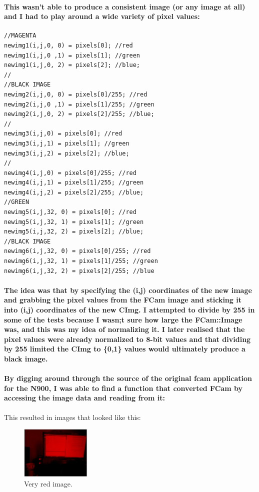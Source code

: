 \documentclass[11pt]{article} %
\begin{document}
\paragraph{This wasn't able to produce a consistent image (or any image at all) and I had to play around a wide variety of pixel values:}
\begin{frame}[fragile]
\begin{verbatim}
//MAGENTA
newimg1(i,j,0, 0) = pixels[0]; //red
newimg1(i,j,0 ,1) = pixels[1]; //green
newimg1(i,j,0, 2) = pixels[2]; //blue;
//
//BLACK IMAGE
newimg2(i,j,0, 0) = pixels[0]/255; //red
newimg2(i,j,0 ,1) = pixels[1]/255; //green
newimg2(i,j,0, 2) = pixels[2]/255; //blue;
//
newimg3(i,j,0) = pixels[0]; //red
newimg3(i,j,1) = pixels[1]; //green
newimg3(i,j,2) = pixels[2]; //blue;
//
newimg4(i,j,0) = pixels[0]/255; //red
newimg4(i,j,1) = pixels[1]/255; //green
newimg4(i,j,2) = pixels[2]/255; //blue;
//GREEN
newimg5(i,j,32, 0) = pixels[0]; //red
newimg5(i,j,32, 1) = pixels[1]; //green
newimg5(i,j,32, 2) = pixels[2]; //blue;
//BLACK IMAGE
newimg6(i,j,32, 0) = pixels[0]/255; //red
newimg6(i,j,32, 1) = pixels[1]/255; //green
newimg6(i,j,32, 2) = pixels[2]/255; //blue
\end{verbatim}
\end{frame}
\paragraph{The idea was that by specifying the (i,j) coordinates of the new image and grabbing the pixel values from the FCam image and sticking it into (i,j) coordinates of the new CImg. I attempted to divide by 255 in some of the tests because I wasn;t sure how large the FCam::Image was, and this was my idea of normalizing it. I later realised that the pixel values were already normalized to 8-bit values and that dividing by 255 limited the CImg to \{0,1\} values would ultimately produce a black image.}
\paragraph{By digging around through the source of the original fcam application for the N900, I was able to find a function that converted FCam by accessing the image data and reading from it:}
\begin{frame}[fragile]

\end{frame}
This resulted in images that looked like this:
\begin{figure}
	\vspace{-20pt}
	\begin{center}
		\includegraphics[width=0.3\textwidth]{../images/redbuffer1}
	\end{center}
	\vspace{-20pt}
	\caption{Very red image.}
\end{figure}
\end{document}
